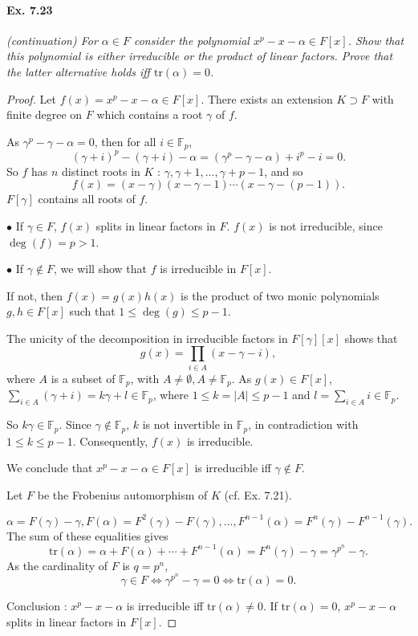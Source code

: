 \documentclass[11pt,a4paper]{article}
\newcommand{\F}{\mathbb{F}}
\begin{document}
\paragraph{Ex. 7.23}

{\it (continuation) For $\alpha \in F$ consider the polynomial $x^p-x-\alpha \in F[x]$. Show that this polynomial is either irreducible or the product of linear factors. Prove that the latter alternative holds iff $\mathrm{tr}(\alpha) = 0$.

}

\begin{proof}
Let $f(x) = x^p -x -\alpha \in F[x]$. There exists an extension $K \supset F$ with finite degree on $F$ which contains a root $\gamma$ of $f$.

As $\gamma^p - \gamma - \alpha = 0$, then for all $i\in \F_p$,
$$(\gamma + i)^p - (\gamma+i) - \alpha = (\gamma^p - \gamma - \alpha) + i^p - i = 0.$$
So $f$ has $n$ distinct roots in $K$ : $\gamma, \gamma+1,\ldots,\gamma+p-1$, and so
$$f(x) = (x-\gamma)(x-\gamma-1)\cdots(x-\gamma-(p-1)).$$
$F[\gamma] $ contains all roots of $f$.

$\bullet$ If $\gamma \in F$, $f(x)$ splits in linear factors in $F$. $f(x)$ is not irreducible, since $\deg(f) = p>1$.

$\bullet$ If $\gamma \not \in F$, we will show that $f$ is irreducible in $F[x]$.

If not, then $f(x) = g(x) h(x)$ is the product of two monic polynomials $g,h \in F[x]$ such that $1\leq \deg(g) \leq p-1$.

The unicity of the decomposition in irreducible factors in $F[\gamma][x]$ shows that
$$g(x) = \prod_{i\in A} (x-\gamma -i),$$
where $A$ is a subset of $\F_p$, with $A \ne \emptyset, A \ne \F_p$.
As $g(x) \in F[x]$, $\sum\limits_{i\in A} (\gamma+i) = k \gamma +l \in \F_p$, where $1 \leq k = |A| \leq p-1$ and $l = \sum\limits_{i\in A} i \in \F_p$.

So $k\gamma \in \F_p$. Since $\gamma \not \in \F_p$, $k$ is not invertible in $\F_p$, in contradiction with $1\leq k \leq p-1$. Consequently,  $f(x)$ is irreducible.

We conclude that $x^p-x-\alpha \in F[x]$ is irreducible iff $\gamma \not \in F$.

\bigskip

Let $F$ be the Frobenius automorphism of $K$ (cf. Ex. 7.21).

$$\alpha = F(\gamma) - \gamma, F(\alpha) = F^2(\gamma) - F(\gamma), \ldots, F^{n-1}(\alpha) = F^n(\gamma) - F^{n-1}(\gamma).$$
The sum of these equalities gives
$$\mathrm{tr}(\alpha) = \alpha+F(\alpha)+\cdots+F^{n-1}(\alpha) = F^n(\gamma) - \gamma = \gamma^{p^n} - \gamma .$$
As the cardinality of $F$ is $q=p^n$,
$$\gamma \in F \iff \gamma^{p^n} - \gamma = 0 \iff \mathrm{tr}(\alpha) = 0.$$

Conclusion : $x^p - x - \alpha$ is irreducible iff $\mathrm{tr}(\alpha) \ne 0$. If $\mathrm{tr}(\alpha)= 0$, $x^p - x - \alpha$ splits in linear factors in $F[x]$.
\end{proof}
\end{document}
